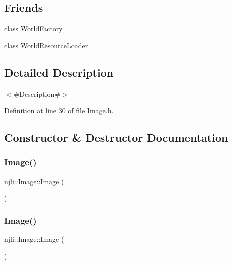 \subsection*{Friends}
\begin{DoxyCompactItemize}
\item 
class \mbox{\hyperlink{classnjli_1_1_image_acb96ebb09abe8f2a37a915a842babfac}{World\+Factory}}
\item 
class \mbox{\hyperlink{classnjli_1_1_image_aa22855a62c62ec48cafb88d34a7cc2f6}{World\+Resource\+Loader}}
\end{DoxyCompactItemize}


\subsection{Detailed Description}
$<$\#\+Description\#$>$ 

Definition at line 30 of file Image.\+h.



\subsection{Constructor \& Destructor Documentation}
\mbox{\label{classnjli_1_1_image_ab4a9a3dbcd9300dba94c600c89ee6eff}} 
\subsubsection{\texorpdfstring{Image()}{Image()}\hspace{0.1cm}{\footnotesize\ttfamily [1/3]}}
{\footnotesize\ttfamily njli\+::\+Image\+::\+Image (\begin{DoxyParamCaption}{ }\end{DoxyParamCaption})\hspace{0.3cm}{\ttfamily [protected]}}

\mbox{\label{classnjli_1_1_image_a93bd5b6d3f6955819dad53bae0b2b724}} 
\subsubsection{\texorpdfstring{Image()}{Image()}\hspace{0.1cm}{\footnotesize\ttfamily [2/3]}}
{\footnotesize\ttfamily njli\+::\+Image\+::\+Image (\begin{DoxyParamCaption}\item[{const \mbox{\hyperlink{classnjli_1_1_abstract_builder}{Abstract\+Builder}} \&}]{ }\end{DoxyParamCaption})\hspace{0.3cm}{\ttfamily [protected]}}

